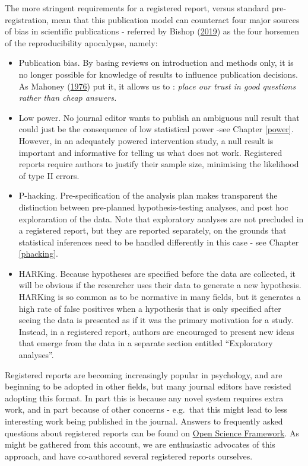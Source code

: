 \documentclass{krantz}
\begin{document}
The more stringent requirements for a registered report, versus standard pre-registration, mean that this publication model can counteract four major sources of bias in scientific publications - referred by Bishop (\protect\hyperlink{ref-bishop2019}{2019}) as the four horsemen of the reproducibility apocalypse, namely:

\begin{itemize}
\item
  Publication bias. By basing reviews on introduction and methods only, it is no longer possible for knowledge of results to influence publication decisions. As Mahoney (\protect\hyperlink{ref-mahoney1976}{1976}) put it, it allows us to : \emph{place our trust in good questions rather than cheap answers.}
\item
  Low power. No journal editor wants to publish an ambiguous null result that could just be the consequence of low statistical power -see Chapter \ref{power}. However, in an adequately powered intervention study, a null result is important and informative for telling us what does not work. Registered reports require authors to justify their sample size, minimising the likelihood of type II errors.
\item
  P-hacking. Pre-specification of the analysis plan makes transparent the distinction between pre-planned hypothesis-testing analyses, and post hoc exploraration of the data. Note that exploratory analyses are not precluded in a registered report, but they are reported separately, on the grounds that statistical inferences need to be handled differently in this case - see Chapter \ref{phacking}.
\item
  HARKing. Because hypotheses are specified before the data are collected, it will be obvious if the researcher uses their data to generate a new hypothesis. HARKing is so common as to be normative in many fields, but it generates a high rate of false positives when a hypothesis that is only specified after seeing the data is presented as if it was the primary motivation for a study. Instead, in a registered report, authors are encouraged to present new ideas that emerge from the data in a separate section entitled ``Exploratory analyses''.
\end{itemize}

Registered reports are becoming increasingly popular in psychology, and are beginning to be adopted in other fields, but many journal editors have resisted adopting this format. In part this is because any novel system requires extra work, and in part because of other concerns - e.g.~that this might lead to less interesting work being published in the journal. Answers to frequently asked questions about registered reports can be found on \href{https://www.cos.io/initiatives/registered-reports?_ga=2.82702869.289676806.1627987440-1355006079.1608014416}{Open Science Framework}. As might be gathered from this account, we are enthusiastic advocates of this approach, and have co-authored several registered reports ourselves.
\end{document}
